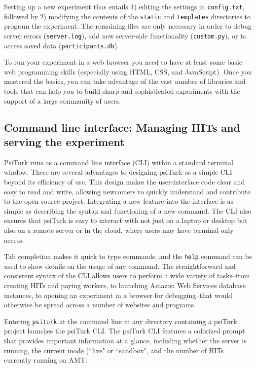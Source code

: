 \documentclass[twocolumn]{svjour3}          %
\begin{document}
Setting up a new experiment thus entails 1) editing the settings in \texttt{config.txt}, followed by 2) modifying the contents of the \texttt{static} and \texttt{templates} directories to program the experiment.
The remaining files are only necessary in order to debug server errors (\texttt{server.log}), add new server-side functionality (\texttt{custom.py}), or to access saved data (\texttt{participants.db}).

To run your experiment in a web browser you need to have at least some basic web programming skills (especially using HTML, CSS, and JavaScript).
Once you mastered the basics, you can take advantage of the vast number of libraries and tools that can help you to build sharp and sophisticated experiments with the support of a large community of users.


\subsection{Command line interface: Managing HITs and serving the experiment}

PsiTurk runs as a command line interface (CLI) within a standard terminal window.
There are several advantages to designing psiTurk as a simple CLI beyond its efficiency of use. This
design makes the user-interface code clear and easy to read and write, allowing newcomers to quickly
understand and contribute to the open-source project. Integrating a new feature into the interface
is as simple as describing the syntax and functioning of a new command. The CLI also ensures that
psiTurk is easy to interact with not just on a laptop or desktop but also on a remote server or in
the cloud, where users may have terminal-only access.
 
Tab completion makes it quick to type commands, and the \texttt{help} command can be used to show
details on the usage of any command. 
The straightforward and consistent syntax of the CLI allows
users to perform a wide variety of tasks--from creating HITs and paying workers, to launching Amazon
Web Services database instances, to opening an experiment in a browser for debugging--that
would otherwise be spread across a number of websites and programs. 

Entering
\texttt{psiturk} at the command line in any directory containing a psiTurk project launches the
psiTurk CLI.
The psiTurk CLI features a colorized prompt that provides important information at a glance, including
whether the server is running, the current mode (``live" or ``sandbox", and the number of HITs currently running on AMT:
\end{document}
